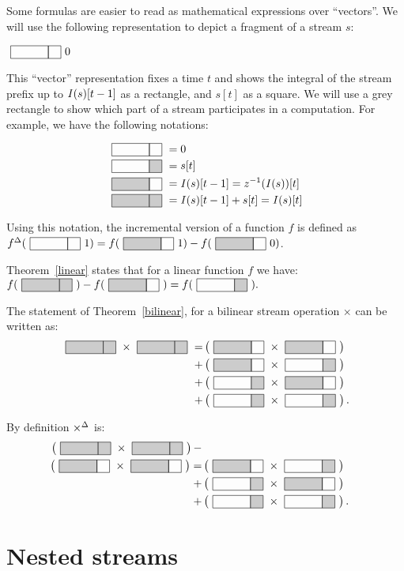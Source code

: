 Some formulas are easier to read as mathematical expressions over ``vectors''.
We will use the following representation to depict a fragment of a stream $s$:

$\strm{0}{0}$

This ``vector'' representation fixes a time $t$ and shows the integral of the stream prefix
up to $\mathit{I}(s)[t-1]$ as a rectangle, and $s[t]$ as a square.  We will use a grey rectangle to 
show which part of a stream participates in a computation.  For example, we have the following
notations:

$$
\begin{aligned}
\strm{0 0} &= 0 \\
\strm{0 1} &= s[t] \\
\strm{1 0} &= \I(s)[t-1] = \zm(\I(s))[t] \\
\strm{1 1} &= \I(s)[t-1] + s[t] = \I(s)[t] 
\end{aligned}
$$

Using this notation, the incremental version of a function $f$ is defined
as $\inc{f}(\strm{0}{1}) = f(\strm{1}{1}) - f(\strm{1}{0})$.

Theorem~\ref{linear} states that for a linear function $f$ we have: \\
$f(\strm{1 1}) - f(\strm{1 0}) = f(\strm{0 1}).$

The statement of Theorem~\ref{bilinear}, for a bilinear stream operation 
$\times$ can be written as:
$$
\begin{aligned}
\strm{1 1} \times \strm{1 1} = & 
\matmult{\strm{1 0}}{\strm{1 0}} \\ + & 
\matmult{\strm{1 0}}{\strm{0 1}} \\ + & 
\matmult{\strm{0 1}}{\strm{1 0}} \\ + & 
\matmult{\strm{0 1}}{\strm{0 1}}.
\end{aligned}
$$

By definition ${\times}^{\Delta}$ is: 
$$
\begin{aligned}
\matmult{\strm{1 1}}{\strm{1 1}} - \\
\matmult{\strm{1 0}}{\strm{1 0}} = &
\matmult{\strm{1 0}}{\strm{0 1}} \\ + & 
\matmult{\strm{0 1}}{\strm{1 0}} \\ + & 
\matmult{\strm{0 1}}{\strm{0 1}}.
\end{aligned}
$$

\section{Nested streams}

